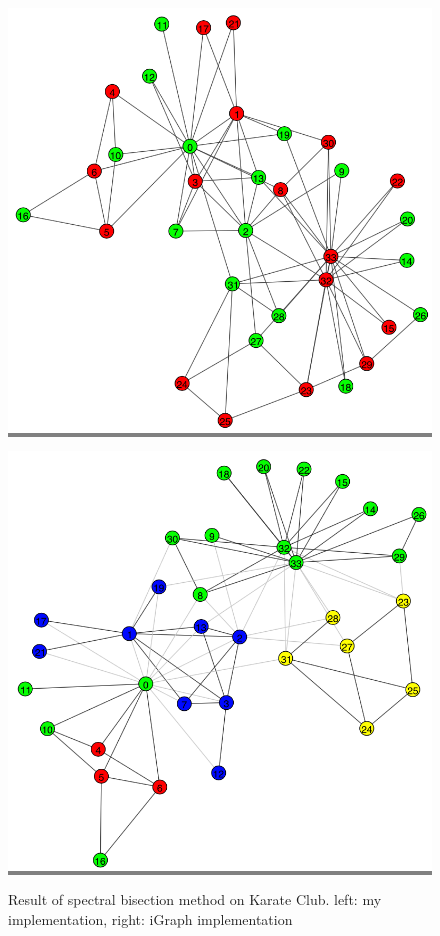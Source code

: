 \documentclass{article}
\begin{document}
\begin{figure}[h]
    \begin{minipage}{0.48\textwidth}
    \colorbox{gray}{\includegraphics[width=\linewidth]{./images/spec-j.png}}
    \end{minipage}
    \hspace{\fill}
    \begin{minipage}{0.48\textwidth}
    \colorbox{gray}{\includegraphics[width=\linewidth]{./images/spec-i.png}}
    \end{minipage}

    \caption{Result of spectral bisection method on Karate Club. left: my implementation, right: iGraph implementation}
    \label{spec}
\end{figure}
\end{document}
